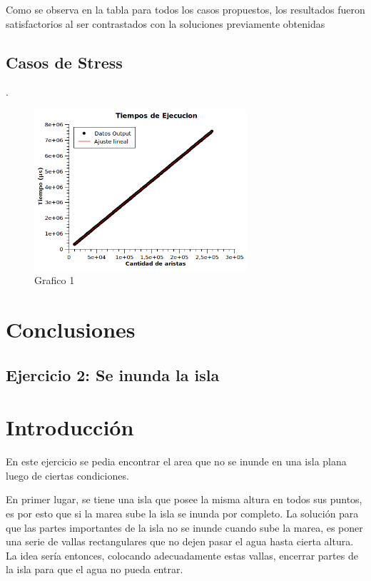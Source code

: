 \documentclass[a4paper, 12pt]{article}
\begin{document}
Como se observa en la tabla para todos los casos propuestos, los resultados fueron satisfactorios al ser contrastados con la soluciones previamente obtenidas

\subsection*{Casos de Stress}.

\begin{figure}[H]
\centering
\includegraphics[width=0.7\textwidth]{imagenes/Resultados1.png} 
\caption{Grafico 1}
\end{figure}

\section*{Conclusiones}


\begin{center}
\item \section*{Ejercicio 2: Se inunda la isla}
\end{center}

\section*{Introducci\'on}
En este ejercicio se pedia encontrar el area que no se inunde en una isla plana luego de ciertas condiciones.

En primer lugar, se tiene una isla que posee la misma altura en todos sus puntos, es por esto que si la marea sube la isla se inunda por completo. La soluci\'on para que las partes importantes de la isla no se inunde cuando sube la marea, es poner una serie de vallas rectangulares que no dejen pasar el agua hasta cierta altura. La idea ser\'ia entonces, colocando adecuadamente estas vallas, encerrar partes de la isla para que el agua no pueda entrar.
\end{document}

